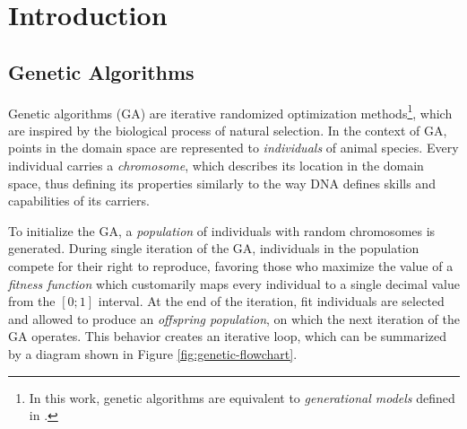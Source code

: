 \chapter{Introduction}

\section{Genetic Algorithms}
Genetic algorithms (GA) are iterative randomized optimization methods\footnote{In this work, genetic algorithms are equivalent to \textit{generational models} defined in \cite{AdaptationInSystems}.}, which are inspired by the biological process of natural selection. In the context of GA, points in the domain space are represented to \textit{individuals} of animal species. Every individual carries a \textit{chromosome}, which describes its location in the domain space, thus defining its properties similarly to the way DNA defines skills and capabilities of its carriers.

To initialize the GA, a \textit{population} of individuals with random chromosomes is generated. During single iteration of the GA, individuals in the population compete for their right to reproduce, favoring those who maximize the value of a \textit{fitness function} which customarily maps every individual to a single decimal value from the $[0;1]$ interval. At the end of the iteration, fit individuals are selected and allowed to produce an \textit{offspring population}, on which the next iteration of the GA operates. This behavior creates an iterative loop, which can be summarized by a diagram shown in Figure \ref{fig:genetic-flowchart}.

